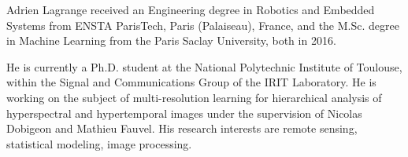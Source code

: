\documentclass[journal,10pt]{IEEEtran}
\begin{document}
%

\begin{IEEEbiography}{Adrien Lagrange} received an Engineering degree in Robotics and Embedded Systems from ENSTA ParisTech, Paris (Palaiseau), France, and the M.Sc. degree in Machine Learning from the Paris Saclay University, both in 2016.

He is currently a Ph.D. student at the National Polytechnic Institute of Toulouse, within the Signal and Communications Group of the IRIT Laboratory. He is working on the subject of multi-resolution learning for hierarchical analysis of hyperspectral and hypertemporal images under the supervision of Nicolas Dobigeon and Mathieu Fauvel. His research interests are remote sensing, statistical modeling, image processing.
\end{IEEEbiography}
\end{document}
